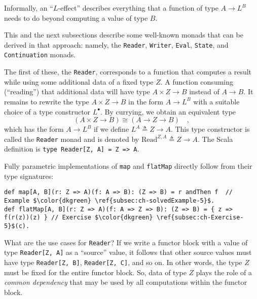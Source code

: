 Informally, an \textsf{``}$L$-effect\textsf{''} describes everything that a function
of type $A\rightarrow L^{B}$ needs to do beyond computing a value
of type $B$. %
\begin{comment}
In some cases, this vague idea of \textsf{``}effect\textsf{''} can be made concrete
by writing the required type of the computation in the form $A\rightarrow L^{B}$
with a specific type constructor $L$ .
\end{comment}
{} This and the next subsections describe some well-known monads that
can be derived in that approach: namely, the \lstinline!Reader!,
\lstinline!Writer!, \lstinline!Eval!, \lstinline!State!, and \lstinline!Continuation!
monads.

The first of these, the \lstinline!Reader!, corresponds to a function
that computes a result while using some additional data of a fixed
type $Z$. A function consuming (\textsf{``}reading\textsf{''}) that additional data
will have type $A\times Z\rightarrow B$ instead of $A\rightarrow B$.
It remains to rewrite the type $A\times Z\rightarrow B$ in the form
$A\rightarrow L^{B}$ with a suitable choice of a type constructor
$L^{\bullet}$. By currying, we obtain an equivalent type
\[
(A\times Z\rightarrow B)\cong(A\rightarrow Z\rightarrow B)\quad,
\]
which has the form $A\rightarrow L^{B}$ if we define $L^{A}\triangleq Z\rightarrow A$.
This type constructor is called the \lstinline!Reader! monad
and is denoted by $\text{Read}^{Z,A}\triangleq Z\rightarrow A$. The
Scala definition is \lstinline!type Reader[Z, A] = Z => A!.

Fully parametric implementations of \lstinline!map! and \lstinline!flatMap!
directly follow from their type signatures:
\begin{lstlisting}[mathescape=true]
def map[A, B](r: Z => A)(f: A => B): (Z => B) = r andThen f  // Example $\color{dkgreen} \ref{subsec:ch-solvedExample-5}$.
def flatMap[A, B](r: Z => A)(f: A => Z => B): (Z => B) = { z => f(r(z))(z) } // Exercise $\color{dkgreen} \ref{subsec:ch-Exercise-5}$(c).
\end{lstlisting}

What are the use cases for \lstinline!Reader!? If we write a functor
block with a value of type \lstinline!Reader[Z, A]! as a \textsf{``}source\textsf{''}
value, it follows that other source values must have type \lstinline!Reader[Z, B]!,
\lstinline!Reader[Z, C]!, and so on. In other words, the type $Z$
must be fixed for the entire functor block. So, data of type $Z$
plays the role of a \emph{common dependency} that may be used by all
computations within the functor block.

